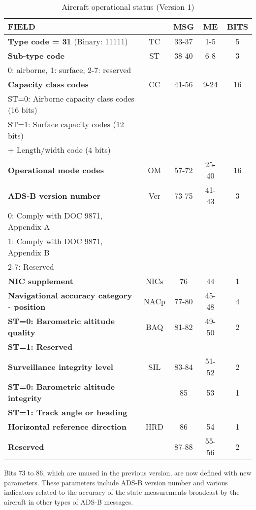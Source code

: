 \begin{table}[ht]
\caption{Aircraft operational status (Version 1)}
\label{tb:adsb-operational-status-v1}
\footnotesize
\begin{tabular}{|l|c|c|c|c|}
\hline
\textbf{FIELD} &  & \textbf{MSG} & \textbf{ME} & \textbf{BITS} \\ \hline \hline
\textbf{Type code = 31} (Binary: 11111) & TC & 33-37 & 1-5 & 5 \\ \hline
\textbf{Sub-type code} & ST & 38-40 & 6-8 & 3\\
0: airborne, 1: surface, 2-7: reserved &&&&  \\ \hline
\textbf{Capacity class codes} & CC & 41-56 & 9-24 & 16 \\
ST=0: Airborne capacity class codes (16 bits) &&&& \\
ST=1: Surface capacity codes (12 bits) &&&& \\
\quad\qquad+ Length/width code (4 bits) &&&& \\ \hline
\textbf{Operational mode codes} & OM & 57-72 & 25-40 & 16 \\ \hline
\textbf{ADS-B version number} & Ver & 73-75 & 41-43 & 3\\ 
0: Comply with DOC 9871, Appendix A &&&& \\
1: Comply with DOC 9871, Appendix B &&&& \\
2-7: Reserved &&&& \\ \hline
\textbf{NIC supplement} & NICs & 76 & 44 & 1 \\ \hline
\textbf{Navigational accuracy category - position} & NACp & 77-80 & 45-48 & 4 \\ \hline
\textbf{ST=0: Barometric altitude quality} & BAQ & 81-82 & 49-50 & 2\\
\textbf{ST=1: Reserved} &&&& \\ \hline
\textbf{Surveillance integrity level} & SIL & 83-84 & 51-52 & 2 \\ \hline
\textbf{ST=0: Barometric altitude integrity} & & 85 & 53 & 1\\
\textbf{ST=1: Track angle or heading} & & & &  \\ \hline
\textbf{Horizontal reference direction} & HRD & 86 & 54 & 1 \\ \hline
\textbf{Reserved} & & 87-88 & 55-56 & 2 \\ \hline
\end{tabular}
\end{table}

Bits 73 to 86, which are unused in the previous version, are now defined with new parameters. These parameters include ADS-B version number and various indicators related to the accuracy of the state measurements broadcast by the aircraft in other types of ADS-B messages.

